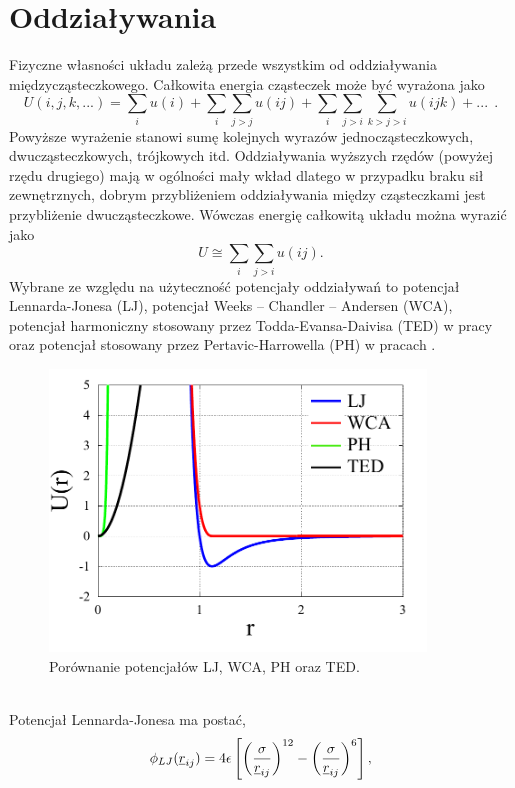 \documentclass[12pt,a4paper,openright]{report} %
\begin{document}
\section{Oddziaływania}
\label{oddzialywania}
Fizyczne własności układu zależą przede wszystkim od oddziaływania międzycząsteczkowego. Całkowita energia cząsteczek może być wyrażona jako
%
\begin{equation}
U(i,j,k,...)=\sum \limits_{i} u(i) + \sum \limits_{i} \sum \limits_{j>j} u(ij) + \sum \limits_{i} \sum \limits_{j>i} \sum \limits_{k>j>i} u(ijk)+ ...~~.
\end{equation}
Powyższe wyrażenie stanowi sumę kolejnych wyrazów jednocząsteczkowych, dwucząsteczkowych, trójkowych itd. Oddziaływania wyższych rzędów (powyżej rzędu drugiego) mają w ogólności mały wkład dlatego w przypadku braku sił zewnętrznych, dobrym przybliżeniem oddziaływania między cząsteczkami jest przybliżenie dwucząsteczkowe. Wówczas energię całkowitą układu można wyrazić jako
\begin{equation}
U \cong \sum \limits_{i} \sum \limits_{j>i} u(ij).
\end{equation}
Wybrane ze względu na użyteczność potencjały oddziaływań to potencjał Lennarda-Jonesa (LJ), potencjał Weeks – Chandler – Andersen (WCA), potencjał harmoniczny stosowany przez Todda-Evansa-Daivisa (TED) w pracy \cite{Todd} oraz potencjał stosowany przez Pertavic-Harrowella (PH) w pracach \cite{Petravic2005, PetravicHarrowell2006}.
\begin{figure}[h]
\centering
\includegraphics[width=100mm]{rysunki/potencjaly.pdf}
\caption{Porównanie potencjałów LJ, WCA, PH oraz TED.}
\label{potencjaly}
\end{figure}
\\
{Potencjał Lennarda-Jonesa} ma postać,
\begin{equation}
\phi_{LJ}(\underline{r}_{ij})=4 \epsilon \left[ \left( \sigma \over \underline{r}_{ij} \right)^{12} - \left( \sigma \over \underline{r}_{ij} \right)^{6} \right],
\end{equation}
\end{document}
